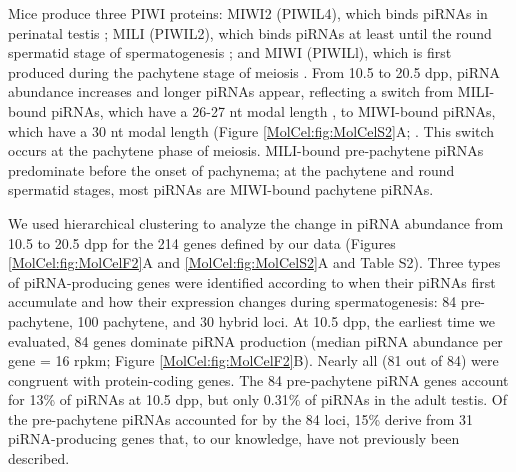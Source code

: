     Mice produce three PIWI proteins: MIWI2 (PIWIL4), which binds piRNAs in perinatal testis \citep{Carmell2007, Aravin2008a}; MILI (PIWIL2), which binds piRNAs at least until the round spermatid stage of spermatogenesis \citep{Kuramochi-Miyagawa2004, Aravin2006, Aravin2007a}; and MIWI (PIWILl), which is first produced during the pachytene stage of meiosis \citep{Deng2002c}. From 10.5 to 20.5 dpp, piRNA abundance increases and longer piRNAs appear, reflecting a switch from MILI-bound piRNAs, which have a 26-27 nt modal length \citep{Montgomery1998, Aravin2006, Aravin2008a, Robine2009}, to MIWI-bound piRNAs, which have a 30 nt modal length (Figure \ref{MolCel:fig:MolCelS2}A; \citep{Reuter2009, Robine2009}. This switch occurs at the pachytene phase of meiosis. MILI-bound pre-pachytene piRNAs predominate before the onset of pachynema; at the pachytene and round spermatid stages, most piRNAs are MIWI-bound pachytene piRNAs.

    We used hierarchical clustering to analyze the change in piRNA abundance from 10.5 to 20.5 dpp for the 214 genes defined by our data (Figures \ref{MolCel:fig:MolCelF2}A and \ref{MolCel:fig:MolCelS2}A and Table S2). Three types of piRNA-producing genes were identified according to when their piRNAs first accumulate and how their expression changes during spermatogenesis: 84 pre-pachytene, 100 pachytene, and 30 hybrid loci. At 10.5 dpp, the earliest time we evaluated, 84 genes dominate piRNA production (median piRNA abundance per gene = 16 rpkm; Figure \ref{MolCel:fig:MolCelF2}B). Nearly all (81 out of 84) were congruent with protein-coding genes. The 84 pre-pachytene piRNA genes account for 13\% of piRNAs at 10.5 dpp, but only 0.31\% of piRNAs in the adult testis. Of the pre-pachytene piRNAs accounted for by the 84 loci, 15\% derive from 31 piRNA-producing genes that, to our knowledge, have not previously been described.

